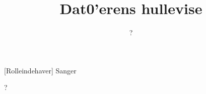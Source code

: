 \documentclass[a4paper,11pt]{article}
\title{Dat0'erens hullevise}
\author{?}
\begin{document}
\maketitle

\begin{roles}  
[Rolleindehaver] Sanger
\end{roles}

?
\end{document}

